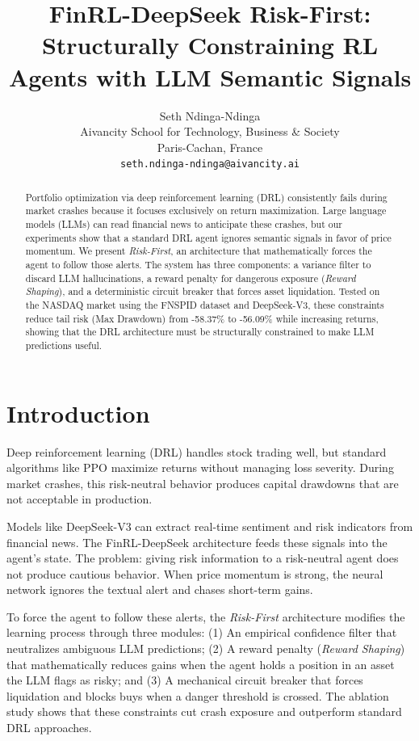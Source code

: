 \documentclass{article}
\title{FinRL-DeepSeek Risk-First: Structurally Constraining RL Agents with LLM Semantic Signals}
\author{%
  Seth Ndinga-Ndinga \\
  Aivancity School for Technology, Business \& Society \\
  Paris-Cachan, France \\
  \texttt{seth.ndinga-ndinga@aivancity.ai} \\
}
\begin{document}
\maketitle


\begin{abstract}
Portfolio optimization via deep reinforcement learning (DRL) consistently fails during market crashes because it focuses exclusively on return maximization. Large language models (LLMs) can read financial news to anticipate these crashes, but our experiments show that a standard DRL agent ignores semantic signals in favor of price momentum. We present \textit{Risk-First}, an architecture that mathematically forces the agent to follow those alerts. The system has three components: a variance filter to discard LLM hallucinations, a reward penalty for dangerous exposure (\textit{Reward Shaping}), and a deterministic circuit breaker that forces asset liquidation. Tested on the NASDAQ market using the FNSPID dataset and DeepSeek-V3, these constraints reduce tail risk (Max Drawdown) from -58.37\% to -56.09\% while increasing returns, showing that the DRL architecture must be structurally constrained to make LLM predictions useful.
\end{abstract}

\section{Introduction}

Deep reinforcement learning (DRL) handles stock trading well, but standard algorithms like PPO maximize returns without managing loss severity. During market crashes, this risk-neutral behavior produces capital drawdowns that are not acceptable in production.

Models like DeepSeek-V3 can extract real-time sentiment and risk indicators from financial news. The FinRL-DeepSeek architecture \cite{benhenda2025} feeds these signals into the agent's state. The problem: giving risk information to a risk-neutral agent does not produce cautious behavior. When price momentum is strong, the neural network ignores the textual alert and chases short-term gains.

To force the agent to follow these alerts, the \textit{Risk-First} architecture modifies the learning process through three modules: (1) An empirical confidence filter that neutralizes ambiguous LLM predictions; (2) A reward penalty (\textit{Reward Shaping}) that mathematically reduces gains when the agent holds a position in an asset the LLM flags as risky; and (3) A mechanical circuit breaker that forces liquidation and blocks buys when a danger threshold is crossed. The ablation study shows that these constraints cut crash exposure and outperform standard DRL approaches.
\end{document}
